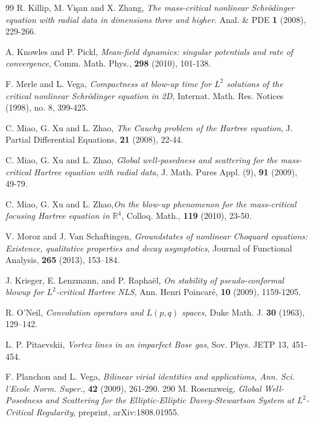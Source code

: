 \documentclass[reqno,11pt]{amsart}
\theoremstyle{plain}
\theoremstyle{definition}
\numberwithin{equation}{section}
\numberwithin{theorem}{section}
\def\R{\mathbb{R}}
\begin{document}
\begin{thebibliography}{99}
R. Killip, M. Vi\c{s}an and X. Zhang,
\emph{The mass-critical nonlinear Schr\"odinger equation with radial data in dimensions three and higher}.
Anal. \& PDE {\bf1} (2008), 229-266.



A. Knowles and P. Pickl, \emph{Mean-field dynamics: singular potentials and rate of convergence}, Comm. Math. Phys., {\bf 298}
(2010),  101-138.

F. Merle and L. Vega, \emph{Compactness at blow-up time for $L^2$ solutions of the critical nonlinear Schr\"odinger equation in 2D}, Internat. Math. Res. Notices (1998), no. 8, 399-425.


C. Miao, G. Xu and L. Zhao, \emph{The Cauchy problem of the Hartree equation}, J. Partial Differential Equations, {\bf21} (2008), 22-44.

C. Miao, G. Xu and L. Zhao,\emph{ Global well-posedness and scattering for the mass-critical Hartree equation with radial data}, J. Math. Pures Appl. (9), {\bf91} (2009), 49-79.

C. Miao, G. Xu and L. Zhao,\emph{On the blow-up phenomenon for the mass-critical focusing Hartree equation in $\R^4$}, Colloq. Math., {\bf119} (2010), 23-50.

V. Moroz and J. Van Schaftingen, \emph{Groundstates of nonlinear Choquard equations: Existence, qualitative properties and decay asymptotics},  Journal of Functional Analysis, {\bf 265} (2013),  153–184.

J. Krieger, E. Lenzmann, and P. Rapha\"el, \emph{On stability of pseudo-conformal blowup for $L^2$-critical Hartree NLS},
Ann. Henri Poincaré, {\bf 10} (2009),  1159-1205.

R. O'Neil, \emph{Convolution operators and $L(p,q)$ spaces,}
	Duke Math. J. {\bf 30} (1963), 129–142.

L. P. Pitaevskii, \emph{Vortex lines in an imparfect Bose gas}, Sov. Phys. JETP 13, 451-454.

F. Planchon and L. Vega, \emph{Bilinear virial identities and applications, Ann. Sci. l'Ecole Norm. Super.}, {\bf 42} (2009),  261-290.
290
 M. Rosenzweig, \emph{Global Well-Posedness and Scattering for the Elliptic-Elliptic Davey-Stewartson System at $L^{2}$-Critical Regularity}, preprint, arXiv:1808.01955. 


\end{thebibliography}
\end{document}
